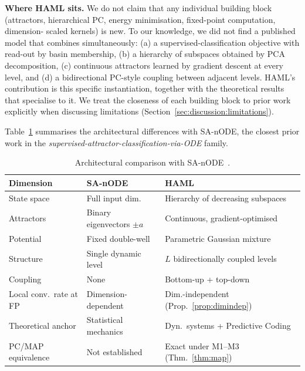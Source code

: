 \documentclass[11pt,a4paper]{article}
\begin{document}
\textbf{Where HAML sits.} We do not claim that any individual building block
(attractors, hierarchical PC, energy minimisation, fixed-point computation, dimension-
scaled kernels) is new. To our knowledge, we did not find a published model that
combines simultaneously: (a) a supervised-classification objective with read-out by
basin membership, (b) a hierarchy of subspaces obtained by PCA decomposition,
(c) continuous attractors learned by gradient descent at every level, and
(d) a bidirectional PC-style coupling between adjacent levels. HAML's contribution is
this specific instantiation, together with the theoretical results that specialise to
it. We treat the closeness of each building block to prior work explicitly when
discussing limitations (Section~\ref{sec:discussion:limitations}).

Table~\ref{tab:comparison_sanode} summarises the architectural differences with
SA-nODE, the closest prior work in the
\emph{supervised-attractor-classification-via-ODE} family.

\begin{table}[h]
\centering
\footnotesize
\setlength{\tabcolsep}{5pt}
\begin{tabular}{lll}
\toprule
\textbf{Dimension} & \textbf{SA-nODE} & \textbf{HAML} \\
\midrule
State space             & Full input dim.\               & Hierarchy of decreasing subspaces \\
Attractors              & Binary eigenvectors $\pm a$    & Continuous, gradient-optimised \\
Potential               & Fixed double-well              & Parametric Gaussian mixture \\
Structure               & Single dynamic level           & $L$ bidirectionally coupled levels \\
Coupling                & None                           & Bottom-up + top-down \\
Local conv.\ rate at FP & Dimension-dependent            & Dim.-independent (Prop.~\ref{prop:dimindep}) \\
Theoretical anchor      & Statistical mechanics          & Dyn.\ systems + Predictive Coding \\
PC/MAP equivalence      & Not established                & Exact under M1--M3 (Thm.~\ref{thm:map}) \\
\bottomrule
\end{tabular}
\caption{Architectural comparison with SA-nODE~\cite{marino2024}.}
\label{tab:comparison_sanode}
\end{table}
\end{document}
